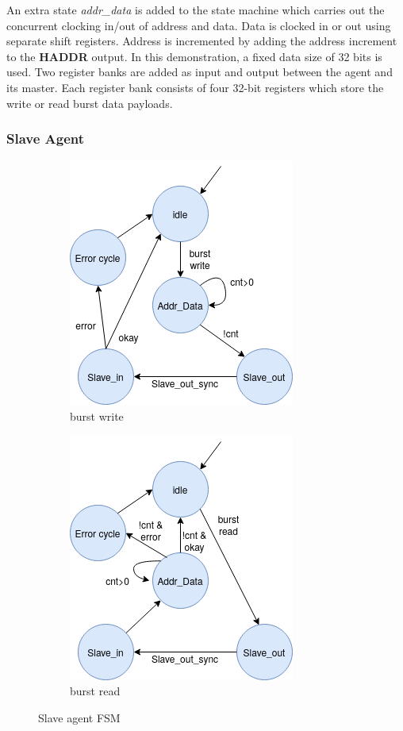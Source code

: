 An extra state \textit{addr\_data} is added to the state machine which carries out the concurrent clocking in/out of address and data. Data is clocked in or out using separate shift registers. Address is incremented by adding the address increment to the \textbf{HADDR} output. In this demonstration, a fixed data size of 32 bits is used. Two register banks are added as input and output between the agent and its master. Each register bank consists of four 32-bit registers which store the write or read burst data payloads. 

\subsubsection{Slave Agent}
\begin{figure}[hbt]
 \centering
 \begin{subfigure}[b]{0.4\linewidth}
 \includegraphics[width=0.7\linewidth]{figs/hw/sAgent_wburstfsm.png}
 \caption{burst write}
 \end{subfigure}
 \begin{subfigure}[b]{0.4\linewidth}
 \includegraphics[width=0.7\linewidth]{figs/hw/sAgent_rburstfsm.png}
 \caption{burst read}
 \end{subfigure}
\caption{Slave agent FSM}
\label{fig:sagt-burstfsm}
\end{figure}

